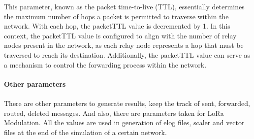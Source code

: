 This parameter, known as the packet time-to-live (TTL), essentially determines the maximum number of hops a packet is permitted to traverse within the network. With each hop, the packetTTL value is decremented by 1. In this context, the packetTTL value is configured to align with the number of relay nodes present in the network, as each relay node represents a hop that must be traversed to reach its destination. Additionally, the packetTTL value can serve as a mechanism to control the forwarding process within the network.\\\\
\textbf{Other parameters}\\\\
There are other parameters to generate results, keep the track of sent, forwarded, routed, deleted messages. And also, there are parameters taken for LoRa Modulation. All the values are used in generation of elog files, scaler and vector files at the end of the simulation of a certain network.\\

